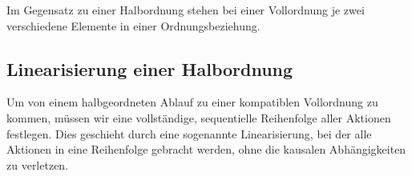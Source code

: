 Im Gegensatz zu einer Halbordnung stehen bei einer Vollordnung je zwei verschiedene Elemente in einer Ordnungsbeziehung.


\subsection*{Linearisierung einer Halbordnung}

Um von einem halbgeordneten Ablauf zu einer kompatiblen Vollordnung zu kommen, müssen wir eine vollständige, sequentielle Reihenfolge aller Aktionen festlegen. Dies geschieht durch eine sogenannte Linearisierung, bei der alle Aktionen in eine Reihenfolge gebracht werden, ohne die kausalen Abhängigkeiten zu verletzen.


